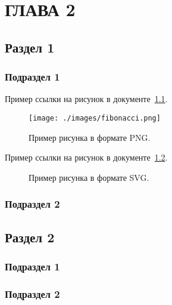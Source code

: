 \chapter{\label{ch:ch02}ГЛАВА 2}

\section{\label{sec:ch02/sec01}Раздел 1}

\subsection{\label{subsec:ch02/sec01/sub01}Подраздел 1}

Пример ссылки на рисунок в документе~\ref{fig:example03}.
\begin{figure}[h]
    \centering
    \texttt{[image: ./images/fibonacci.png]}
    \caption{\centering\label{fig:example03}Пример рисунка в формате PNG.}
\end{figure}

Пример ссылки на рисунок в документе~\ref{fig:example04}.
\begin{figure}[h]
    \centering
    
    \caption{\centering\label{fig:example04}Пример рисунка в формате SVG.}
\end{figure}

\subsection{\label{subsec:ch02/sec01/sub02}Подраздел 2}

\section{\label{sec:ch02/sec02}Раздел 2}

\subsection{\label{subsec:ch02/sec02/sub01}Подраздел 1}

\subsection{\label{subsec:ch02/sec02/sub02}Подраздел 2}

